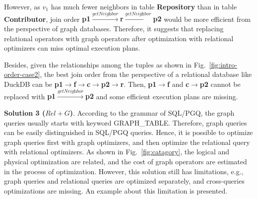{\begin{example}
    However, as $v_1$ has much fewer neighbors in table \textbf{Repository} than in table \textbf{Contributor}, join order \textbf{p1$\xrightarrow{\textit{getNeighbor}}$r$\xrightarrow{\textit{getNeighbor}}$p2} would be more efficient from the perspective of graph databases.
    Therefore, it suggests that
    replacing relational operators with graph operators after optimization with relational optimizers can miss optimal execution plans.

    Besides, given the relationships among the tuples as shown in Fig.~\ref{fig:intro-order-case2}, the best join order from the perspective of a relational database like DuckDB can be \textbf{p1$\rightarrow$f$\rightarrow$c$\rightarrow$p2$\rightarrow$r}.
    Then, \textbf{p1$\rightarrow$f} and \textbf{c$\rightarrow$p2} cannot be replaced with \textbf{p1$\xrightarrow{\textit{getNeighbor}}$p2} and some efficient execution plans are missing.

\end{example}


\textbf{Solution 3 ($Rel+G$)}.
According to the grammar of SQL/PGQ, the graph queries usually starts with keyword GRAPH\_TABLE.
Therefore, graph queries can be easily distinguished in SQL/PGQ queries.
Hence, it is possible to optimize graph queries first with graph optimizers, and then optimize the relational query with relational optimizers.
As shown in Fig.~\ref{fig:catagory}, the logical and physical optimization are related, and the cost of graph operators are estimated in the process of optimization.
However, this solution still has limitations, e.g., graph queries and relational queries are optimized separately, and cross-queries optimizations are missing.
An example about this limitation is presented.

}

